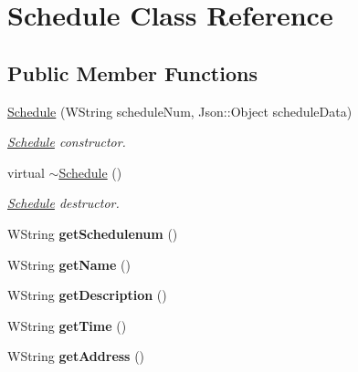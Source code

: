 \hypertarget{classSchedule}{}\section{Schedule Class Reference}
\label{classSchedule}
\subsection*{Public Member Functions}
\begin{DoxyCompactItemize}
\item 
\hyperlink{classSchedule_afe65128cb206d7e0229f605e1c90da87}{Schedule} (W\+String schedule\+Num, Json\+::\+Object schedule\+Data)
\begin{DoxyCompactList}\small\item\em \hyperlink{classSchedule}{Schedule} constructor. \end{DoxyCompactList}\item 
virtual \hyperlink{classSchedule_a4806b985197d35c00b9e707c0ed87998}{$\sim$\+Schedule} ()\hypertarget{classSchedule_a4806b985197d35c00b9e707c0ed87998}{}\label{classSchedule_a4806b985197d35c00b9e707c0ed87998}

\begin{DoxyCompactList}\small\item\em \hyperlink{classSchedule}{Schedule} destructor. \end{DoxyCompactList}\item 
W\+String {\bfseries get\+Schedulenum} ()\hypertarget{classSchedule_af95608a4e73b38a6bcf80f36d351013b}{}\label{classSchedule_af95608a4e73b38a6bcf80f36d351013b}

\item 
W\+String {\bfseries get\+Name} ()\hypertarget{classSchedule_a69ae9ed980b215b71de84c4290518ff9}{}\label{classSchedule_a69ae9ed980b215b71de84c4290518ff9}

\item 
W\+String {\bfseries get\+Description} ()\hypertarget{classSchedule_abfb0f1e5facf1f66b020cfea5950a37d}{}\label{classSchedule_abfb0f1e5facf1f66b020cfea5950a37d}

\item 
W\+String {\bfseries get\+Time} ()\hypertarget{classSchedule_a386615e99bce9e7cb09a7644d73a13a5}{}\label{classSchedule_a386615e99bce9e7cb09a7644d73a13a5}

\item 
W\+String {\bfseries get\+Address} ()\hypertarget{classSchedule_a6dddd11e63ea56b3d26ee85ca25005c9}{}\label{classSchedule_a6dddd11e63ea56b3d26ee85ca25005c9}


\end{DoxyCompactItemize}
